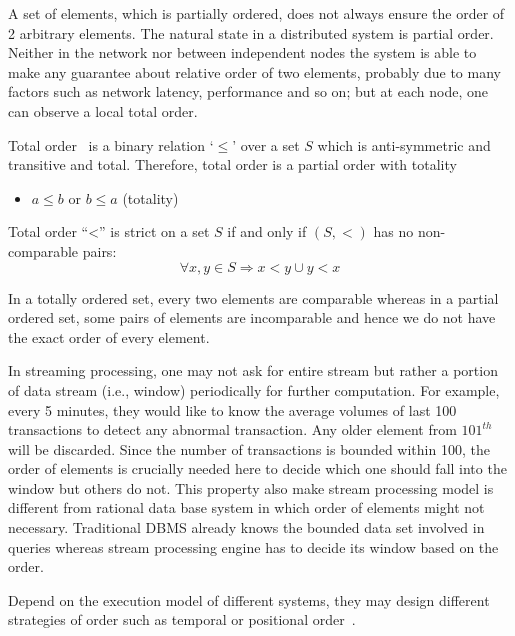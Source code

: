 A set of elements, which is partially ordered, does not always ensure the order of  2 arbitrary elements. The natural state in a distributed system is partial order. Neither in the network nor between independent nodes the system is able to make any guarantee about relative order of two elements, probably due to many factors such as network latency, performance and so on; but at each node, one can observe a local total order.

\begin{defi}
 Total order~\citep{Simovici:2008} is a binary relation `$\leq$' over a set $S$ which is anti-symmetric and transitive and total. Therefore, total order is a partial order with totality
 
 \begin{itemize}
	 \item $a \leq b$ or $b \leq a$  (totality)
\end{itemize}
\end{defi}

Total order ``<'' is strict on a set $S$ if and only if $(S, <)$ has no non-comparable pairs:
\begin{equation}
 \forall x, y \in S \Rightarrow  x < y \cup y < x 
\end{equation} 


In a totally ordered set, every two elements are comparable whereas in a partial ordered set, some pairs of elements are incomparable and hence we do not have the exact order of every element.

In streaming processing, one may not ask for entire stream  but rather a portion of data stream (i.e., window) periodically for further computation. For example, every 5 minutes, they would like to know the average volumes of last 100 transactions to detect any abnormal transaction. Any older element from $101^{th}$ will be discarded. Since the number of transactions is bounded within 100, the order of elements is crucially needed here to decide which one should fall into the window but others do not. This property also make stream processing model is different from rational data base system in which order of elements might not necessary. Traditional DBMS already knows the bounded data set involved in queries whereas stream processing engine has to decide its window based on the order.

Depend on the execution model of different systems, they may design different strategies of order such as temporal or positional order~\citep{Petit:2012}.

